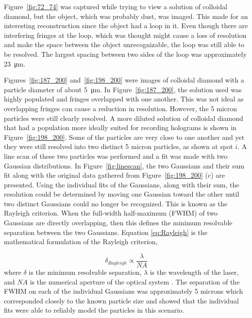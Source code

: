 Figure~\ref{fig:72_74} was captured while trying to view a solution of
colloidal diamond, but the object, which was probably dust, was imaged. This made
for an interesting reconstruction since the object had a loop in it. Even
though there are interfering fringes at the loop, which was thought might cause
a loss of resolution and make the space between the object
unrecognizable, the loop was still able to be resolved. The largest spacing
between two sides of the loop was approximately \SI{23}{\micro\meter}.

Figures~\ref{fig:187_200} and~\ref{fig:198_200} were images of colloidal diamond
with a particle diameter of about \SI{5}{\micro\meter}.
In Figure~\ref{fig:187_200}, the
solution used was highly populated and fringes overlapped with one another.
This was not ideal as overlapping fringes can cause a reduction in
resolution. However, the 5 micron particles were still clearly resolved.
A more diluted solution of colloidal diamond that
had a population more ideally suited for recording holograms is shown in Figure~\ref{fig:198_200}.
Some of the
particles are very close to one another and yet they were still resolved
into two distinct 5 micron particles, as shown at spot $i$. 
A line scan of these two particles was performed and a fit was made with two
Gaussian distributions. In Figure~\ref{fig:linescan}, the two
Gaussians and their sum fit along with the original data gathered from Figure~\ref{fig:198_200}
(c) are presented. Using the individual fits of the Gaussians, along with their sum, the resolution could be
determined by moving one Gaussian toward the other until two distinct Gaussians
could no longer be recognized. This is known as the Rayleigh
criterion. 
When the full-width half-maximum (FWHM) of two Gaussians
are directly overlapping, then this defines the minimum resolvable separation
between the two Gaussians. Equation \ref{eq:Rayleigh} is the mathematical
formulation of the Rayleigh criterion,

\begin{equation}
    \delta_{Rayleigh} \propto \frac{\lambda}{NA}
    \label{eq:Rayleigh}
\end{equation}
%
where $\delta$ is the minimum resolvable separation, $\lambda$ is the
wavelength of the laser, and $NA$ is the numerical aperture of the optical
system \cite{Goodman}.
The separation of the FWHM on each of the individual Gaussians was
approximately 5 microns which corresponded closely to the known particle size and
showed that the individual fits were able to reliably model the particles in this
scenario.


